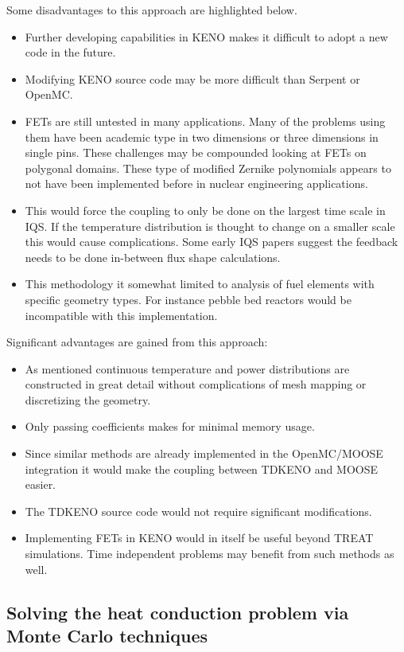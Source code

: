 \documentclass[11pt]{article}
\begin{document}
Some disadvantages to this approach are highlighted below.
	\begin{itemize}
	\item Further developing capabilities in KENO makes it difficult to adopt a new code in the future.
	\item Modifying KENO source code may be more difficult than Serpent or OpenMC.
	\item FETs are still untested in many applications.  Many of the problems using them have been academic type in two dimensions or three dimensions in single pins.  These challenges may be compounded looking at FETs on polygonal domains.  These type of modified Zernike polynomials  appears to not have been implemented before in nuclear engineering applications. 
	\item This would force the coupling to only be done on the largest time scale in IQS.  If the temperature distribution is thought to change on a smaller scale this would cause complications.  Some early IQS papers suggest the feedback needs to be done in-between flux shape calculations. 
	\item This methodology it somewhat limited to analysis of fuel elements with specific geometry types.  For instance pebble bed reactors would be incompatible with this implementation.
	\end{itemize}

Significant advantages are gained from this approach:
	\begin{itemize}
	\item As mentioned continuous temperature and power distributions are constructed in great detail without complications of mesh mapping or discretizing the geometry.
	\item Only passing coefficients makes for minimal memory usage.
	\item Since similar methods are already implemented in  the OpenMC/MOOSE integration it would make the coupling between TDKENO and MOOSE easier. 
	\item The TDKENO source code would not require significant modifications. 
	\item Implementing FETs in KENO would in itself be useful beyond TREAT simulations.  Time independent problems may benefit from such methods as well. 
	\end{itemize}


\subsection{Solving the heat conduction problem via Monte Carlo techniques}
\end{document}

